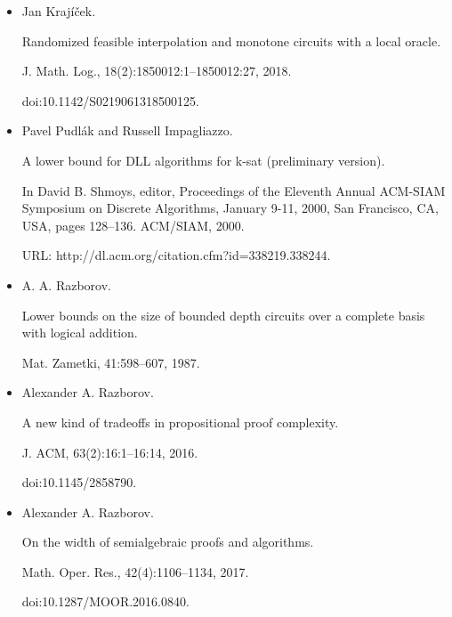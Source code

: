 \begin{itemize}
\item 
[26]

Jan Krajíček.


Randomized feasible interpolation and monotone circuits with a local
oracle.


J. Math. Log., 18(2):1850012:1–1850012:27, 2018.


doi:10.1142/S0219061318500125.





\item 
[27]

Pavel Pudlák and Russell Impagliazzo.


A lower bound for DLL algorithms for k-sat (preliminary
version).


In David B. Shmoys, editor, Proceedings of the Eleventh Annual
ACM-SIAM Symposium on Discrete Algorithms, January 9-11, 2000, San
Francisco, CA, USA, pages 128–136. ACM/SIAM, 2000.


URL: http://dl.acm.org/citation.cfm?id=338219.338244.





\item 
[28]

A. A. Razborov.


Lower bounds on the size of bounded depth circuits over a complete
basis with logical addition.


Mat. Zametki, 41:598–607, 1987.





\item 
[29]

Alexander A. Razborov.


A new kind of tradeoffs in propositional proof complexity.


J. ACM, 63(2):16:1–16:14, 2016.


doi:10.1145/2858790.





\item 
[30]

Alexander A. Razborov.


On the width of semialgebraic proofs and algorithms.


Math. Oper. Res., 42(4):1106–1134, 2017.


doi:10.1287/MOOR.2016.0840.






\end{itemize}
